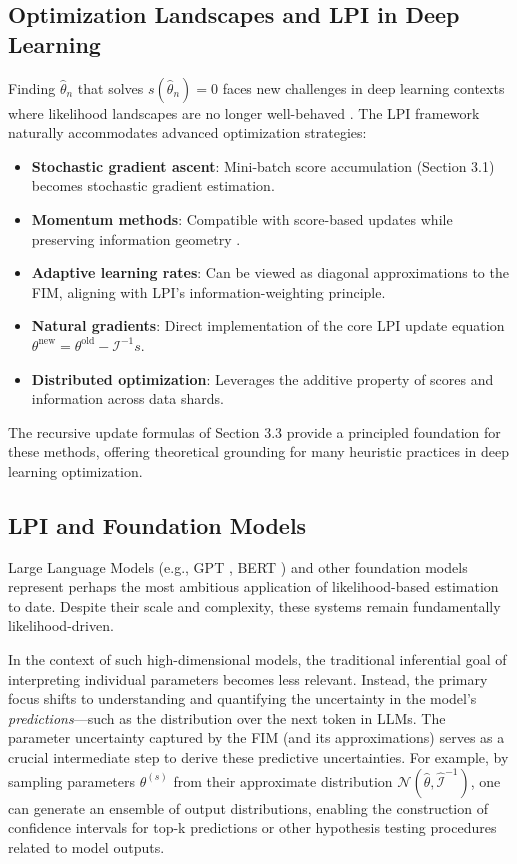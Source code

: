 \documentclass[11pt]{article}
\begin{document}
\subsection{Optimization Landscapes and LPI in Deep Learning}
Finding $\hat{\theta}_n$ that solves $s(\hat{\theta}_n)=0$ faces new challenges in deep learning contexts where likelihood landscapes are no longer well-behaved \cite{dauphin2014identifying}. The LPI framework naturally accommodates advanced optimization strategies:

\begin{itemize}
\item \textbf{Stochastic gradient ascent}: Mini-batch score accumulation (Section 3.1) becomes stochastic gradient estimation.
\item \textbf{Momentum methods}: Compatible with score-based updates while preserving information geometry \cite{sutskever2013importance}.
\item \textbf{Adaptive learning rates}: Can be viewed as diagonal approximations to the FIM, aligning with LPI's information-weighting principle.
\item \textbf{Natural gradients}: Direct implementation of the core LPI update equation $\theta^{\text{new}} = \theta^{\text{old}} - \mathcal{I}^{-1}s$.
\item \textbf{Distributed optimization}: Leverages the additive property of scores and information across data shards.
\end{itemize}

The recursive update formulas of Section 3.3 provide a principled foundation for these methods, offering theoretical grounding for many heuristic practices in deep learning optimization.

\subsection{LPI and Foundation Models}
Large Language Models (e.g., GPT \cite{radford2018improving}, BERT \cite{devlin2018bert}) and other foundation models represent perhaps the most ambitious application of likelihood-based estimation to date. Despite their scale and complexity, these systems remain fundamentally likelihood-driven.

In the context of such high-dimensional models, the traditional inferential goal of interpreting individual parameters becomes less relevant. Instead, the primary focus shifts to understanding and quantifying the uncertainty in the model's \textit{predictions}---such as the distribution over the next token in LLMs. The parameter uncertainty captured by the FIM (and its approximations) serves as a crucial intermediate step to derive these predictive uncertainties. For example, by sampling parameters $\theta^{(s)}$ from their approximate distribution $\mathcal{N}(\hat{\theta}, \hat{\mathcal{I}}^{-1})$, one can generate an ensemble of output distributions, enabling the construction of confidence intervals for top-k predictions or other hypothesis testing procedures related to model outputs.
\end{document}
